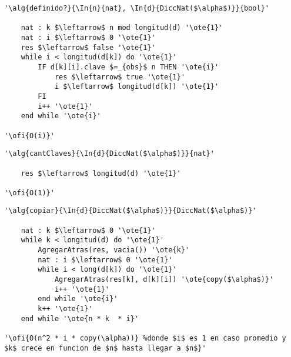 \begin{lstlisting}[mathescape]
'\alg{definido?}{\In{n}{nat}, \In{d}{DiccNat($\alpha$)}}{bool}'

	nat : k $\leftarrow$ n mod longitud(d) '\ote{1}'
	nat : i $\leftarrow$ 0 '\ote{1}'
	res $\leftarrow$ false '\ote{1}'
	while i < longitud(d[k]) do '\ote{1}'
		IF d[k][i].clave $=_{obs}$ n THEN '\ote{i}'
			res $\leftarrow$ true '\ote{1}'
			i $\leftarrow$ longitud(d[k]) '\ote{1}'
		FI
		i++ '\ote{1}'
	end while '\ote{i}'

'\ofi{O(i)}'
\end{lstlisting}

\begin{lstlisting}[mathescape]
'\alg{cantClaves}{\In{d}{DiccNat($\alpha$)}}{nat}'

	res $\leftarrow$ longitud(d) '\ote{1}'

'\ofi{O(1)}'
\end{lstlisting}

\begin{lstlisting}[mathescape]
'\alg{copiar}{\In{d}{DiccNat($\alpha$)}}{DiccNat($\alpha$)}'

	nat : k $\leftarrow$ 0 '\ote{1}'
	while k < longitud(d) do '\ote{1}'
		AgregarAtras(res, vacia()) '\ote{k}'
		nat : i $\leftarrow$ 0 '\ote{1}'
		while i < long(d[k]) do '\ote{1}'
			AgregarAtras(res[k], d[k][i]) '\ote{copy($\alpha$)}'
			i++ '\ote{1}'
		end while '\ote{i}'
		k++ '\ote{1}'
	end while '\ote{n * k  * i}'

'\ofi{O(n^2 * i * copy(\alpha))} %donde $i$ es 1 en caso promedio y $k$ crece en funcion de $n$ hasta llegar a $n$}'
\end{lstlisting}
